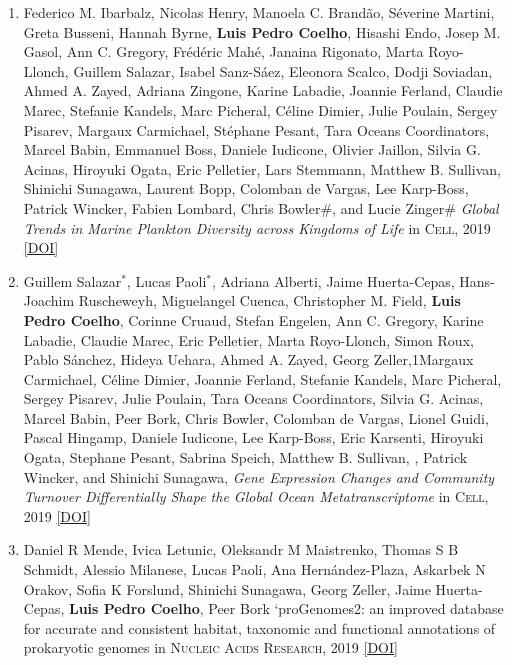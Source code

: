 \documentclass{article}
\newcommand\showdoi[1]{%
    \href{http://dx.doi.org/#1}{[DOI]}%
}
\newcommand\pubname[1]{\textsc{#1}}
\newcommand\costar{${}^{*}$}
\begin{document}
\begin{enumerate}[resume]

\item Federico M. Ibarbalz, Nicolas Henry, Manoela C. Brandão, Séverine
Martini, Greta Busseni, Hannah Byrne, \textbf{Luis Pedro Coelho}, Hisashi Endo,
Josep M. Gasol, Ann C. Gregory, Frédéric Mahé, Janaina Rigonato, Marta
Royo-Llonch, Guillem Salazar, Isabel Sanz-Sáez, Eleonora Scalco, Dodji
Soviadan, Ahmed A. Zayed, Adriana Zingone, Karine Labadie, Joannie Ferland,
Claudie Marec, Stefanie Kandels, Marc Picheral, Céline Dimier, Julie Poulain,
Sergey Pisarev, Margaux Carmichael, Stéphane Pesant, Tara Oceans Coordinators,
Marcel Babin, Emmanuel Boss, Daniele Iudicone, Olivier Jaillon, Silvia G.
Acinas, Hiroyuki Ogata, Eric Pelletier, Lars Stemmann, Matthew B. Sullivan,
Shinichi Sunagawa, Laurent Bopp, Colomban de Vargas, Lee Karp-Boss, Patrick
Wincker, Fabien Lombard, Chris Bowler\#, and Lucie Zinger\# \emph{Global Trends
in Marine Plankton Diversity across Kingdoms of Life} in \pubname{Cell}, 2019
\showdoi{10.1016/j.cell.2019.10.008}

\item Guillem Salazar\costar, Lucas Paoli\costar, Adriana Alberti, Jaime
Huerta-Cepas, Hans-Joachim Ruscheweyh, Miguelangel Cuenca, Christopher M.
Field, \textbf{Luis Pedro Coelho}, Corinne Cruaud, Stefan Engelen, Ann C.
Gregory, Karine Labadie, Claudie Marec, Eric Pelletier, Marta Royo-Llonch,
Simon Roux, Pablo Sánchez, Hideya Uehara, Ahmed A. Zayed, Georg Zeller,1Margaux
Carmichael, Céline Dimier, Joannie Ferland, Stefanie Kandels, Marc Picheral,
Sergey Pisarev, Julie Poulain, Tara Oceans Coordinators, Silvia G. Acinas,
Marcel Babin, Peer Bork, Chris Bowler, Colomban de Vargas, Lionel Guidi, Pascal
Hingamp, Daniele Iudicone, Lee Karp-Boss, Eric Karsenti, Hiroyuki Ogata,
Stephane Pesant, Sabrina Speich, Matthew B. Sullivan, , Patrick Wincker, and
Shinichi Sunagawa, \emph{Gene Expression Changes and Community Turnover
Differentially Shape the Global Ocean Metatranscriptome} in \pubname{Cell},
2019 \showdoi{10.1016/j.cell.2019.10.014}

\item Daniel R Mende, Ivica Letunic, Oleksandr M Maistrenko, Thomas S B Schmidt,
Alessio Milanese, Lucas Paoli, Ana Hernández-Plaza, Askarbek N Orakov, Sofia K
Forslund, Shinichi Sunagawa, Georg Zeller, Jaime Huerta-Cepas, \textbf{Luis
Pedro Coelho}, Peer Bork `proGenomes2: an improved database for accurate and
consistent habitat, taxonomic and functional annotations of prokaryotic genomes
in \pubname{Nucleic Acids Research}, 2019 \showdoi{10.1093/nar/gkz1002}


\end{enumerate}
\end{document}
